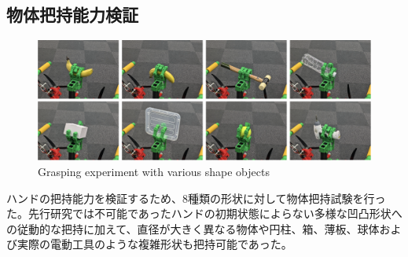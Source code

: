 \documentclass{jarticle}
\begin{document}
\subsection{物体把持能力検証}
\vspace{-2mm}
\begin{figure}[h]
  \centering
  \includegraphics[width=0.8\columnwidth]{figs/graspexp.eps}
  \caption{Grasping experiment with various shape objects}
  \vspace{-2mm}
  \label{fig:zissou}
\end{figure}
ハンドの把持能力を検証するため、8種類の形状に対して物体把持試験を行った。先行研究では不可能であったハンドの初期状態によらない多様な凹凸形状への従動的な把持に加えて、直径が大きく異なる物体や円柱、箱、薄板、球体および実際の電動工具のような複雑形状も把持可能であった。
\end{document}
